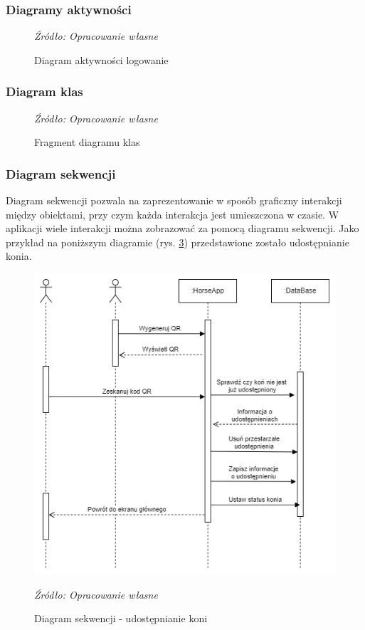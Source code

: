 \documentclass[12pt,oneside]{report}
\begin{document}
\subsubsection{Diagramy aktywności}
\begin{figure}[H]
	\centering
	\caption{Diagram aktywności logowanie}
	\textit{Źródło: Opracowanie własne}
	\label{DiagramAktywnościLogowanie}
\end{figure}
\subsubsection{Diagram klas}
\begin{figure}[H]
	\centering
	\caption{Fragment diagramu klas}
	\textit{Źródło: Opracowanie własne}
	\label{DiagramKlas}
\end{figure}
\subsubsection{Diagram sekwencji}
Diagram sekwencji pozwala na zaprezentowanie w sposób graficzny interakcji między obiektami, przy czym każda interakcja jest umieszczona w czasie. W aplikacji wiele interakcji można zobrazować za pomocą diagramu sekwencji. Jako przykład na poniższym diagramie (rys. \ref{DiagramSekwencjiUdostępnianie}) przedstawione zostało udostępnianie konia. 
\begin{figure}[H]
	\centering
	\includegraphics[scale=0.8]{DiagramSekwencjiUdostępnianie}
	\caption{Diagram sekwencji - udostępnianie koni}
	\textit{Źródło: Opracowanie własne}
	\label{DiagramSekwencjiUdostępnianie}
\end{figure}
\newpage
\end{document}
